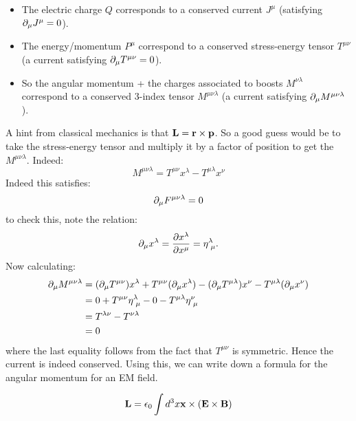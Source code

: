 \begin{itemize}
    \item The electric charge $Q$ corresponds to a conserved current $J^\mu$ (satisfying $\partial_\mu J^\mu = 0$).

    \item The energy/momentum $P^\mu$ correspond to a conserved stress-energy tensor $T^{\mu\nu}$ (a current satisfying $\partial_\mu T^{\mu\nu} = 0$).
    
    \item So the angular momentum + the charges associated to boosts $M^{\nu\lambda}$ correspond to a conserved 3-index tensor $M^{\mu\nu\lambda}$ (a current satisfying $\partial_\mu M^{\mu\nu\lambda}$).
\end{itemize}
A hint from classical mechanics is that $\mathbf{L} = \mathbf{r} \times \mathbf{p}$. So a good guess would be to take the stress-energy tensor and multiply it by a factor of position to get the $M^{\mu\nu\lambda}$. Indeed:
\begin{equation}
    M^{\mu\nu\lambda} = T^{\mu\nu}x^\lambda - T^{\mu\lambda}x^\nu
\end{equation}
Indeed this satisfies:
\begin{equation}
    \partial_\mu F^{\mu\nu\lambda} = 0
\end{equation}
to check this, note the relation:
\begin{equation}
    \p_\mu x^\lambda = \ddpd{x^\lambda}{x^\mu} = \eta^{\lambda}_{\sp\mu}.
\end{equation}
Now calculating:
\begin{equation}
    \begin{split}
        \p_\mu M^{\mu\nu\lambda} &= (\p_\mu T^{\mu\nu}) x^\lambda + T^{\mu\nu}(\p_\mu x^\lambda) - (\p_\mu T^{\mu\lambda})x^\nu - T^{\mu\lambda}(\p_\mu x^\nu)
        \\ &= 0 + T^{\mu\nu}\eta^{\lambda}_{\sp\mu} - 0 - T^{\mu\lambda}\eta^{\nu}_{\sp\mu}
        \\ &= T^{\lambda\nu} - T^{\nu\lambda}
        \\ &= 0
    \end{split}
\end{equation}
where the last equality follows from the fact that $T^{\mu\nu}$ is symmetric. Hence the current is indeed conserved. Using this, we can write down a formula for the angular momentum for an EM field.

\begin{equation}
    \mathbf{L} = \epsilon_0 \int d^3x \mathbf{x} \times (\mathbf{E} \times \mathbf{B})
\end{equation}

